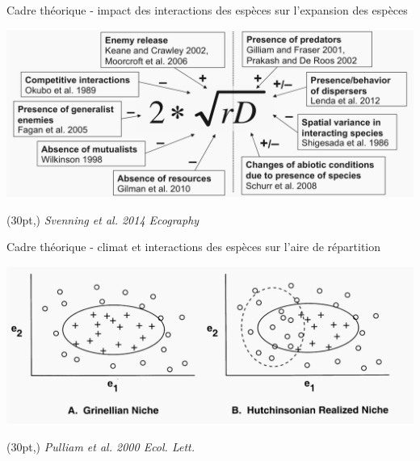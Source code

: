 \documentclass[11pt, compress, aspectratio=1610]{beamer}
\newcommand\smallcitation[1]{%
\begin{textblock*}{\textwidth}(30pt,\textheight)
	\raggedleft \footnotesize\textit{#1}
\end{textblock*}}
\begin{document}
\begin{frame}{Cadre théorique - impact des interactions des espèces sur
l’expansion des espèces}
\protect\hypertarget{cadre-thuxe9orique---impact-des-interactions-des-espuxe8ces-sur-lexpansion-des-espuxe8ces}{}

\centering

\includegraphics[scale=0.48]{figures/Svenning2014.png}

\par

\smallcitation{Svenning et al. 2014 Ecography}

\end{frame}

\begin{frame}{Cadre théorique - climat et interactions des espèces sur
l’aire de répartition}
\protect\hypertarget{cadre-thuxe9orique---climat-et-interactions-des-espuxe8ces-sur-laire-de-ruxe9partition}{}

\centering

\includegraphics[scale=0.45]{figures/Pulliam2000.png}

\par

\smallcitation{Pulliam et al. 2000 Ecol. Lett.}

\end{frame}
\end{document}
